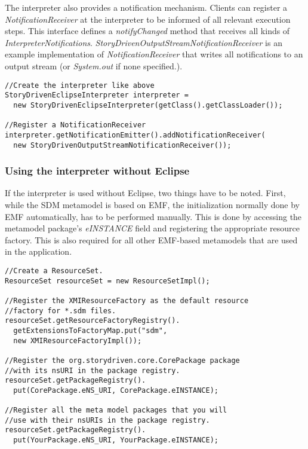 The interpreter also provides a notification mechanism. Clients can register a \emph{NotificationReceiver} at the interpreter to be informed of all
relevant execution steps. This interface defines a \emph{notifyChanged} method that receives all kinds of \emph{InterpreterNotifications}.
\emph{StoryDrivenOutputStreamNotificationReceiver} is an example implementation of \emph{NotificationReceiver} that writes all notifications
to an output stream (or \emph{System.out} if none specified.).

\begin{verbatim}
//Create the interpreter like above
StoryDrivenEclipseInterpreter interpreter = 
  new StoryDrivenEclipseInterpreter(getClass().getClassLoader());

//Register a NotificationReceiver
interpreter.getNotificationEmitter().addNotificationReceiver(
  new StoryDrivenOutputStreamNotificationReceiver());
\end{verbatim}

\subsubsection{Using the interpreter without Eclipse}

If the interpreter is used without Eclipse, two things have to be noted. 
First, while the SDM metamodel is based on EMF, the initialization normally done by EMF automatically, has to be performed manually. 
This is done by accessing the metamodel package's \emph{eINSTANCE} field and registering the appropriate resource factory. 
This is also required for all other EMF-based metamodels that are used in the application.

\begin{verbatim}
//Create a ResourceSet.
ResourceSet resourceSet = new ResourceSetImpl();

//Register the XMIResourceFactory as the default resource 
//factory for *.sdm files.
resourceSet.getResourceFactoryRegistry().
  getExtensionsToFactoryMap.put("sdm", 
  new XMIResourceFactoryImpl());

//Register the org.storydriven.core.CorePackage package 
//with its nsURI in the package registry.
resourceSet.getPackageRegistry().
  put(CorePackage.eNS_URI, CorePackage.eINSTANCE);

//Register all the meta model packages that you will 
//use with their nsURIs in the package registry.
resourceSet.getPackageRegistry().
  put(YourPackage.eNS_URI, YourPackage.eINSTANCE);
\end{verbatim}

